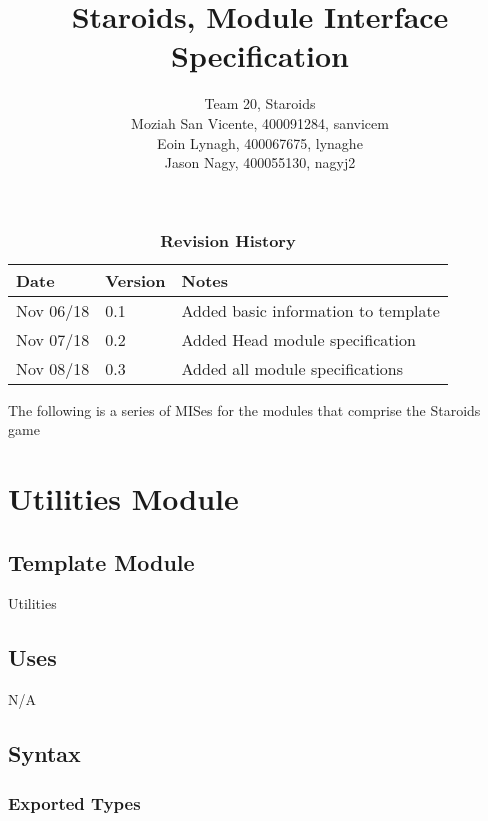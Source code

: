\documentclass[12pt]{article}
\title{Staroids, Module Interface Specification}
\author{Team 20, Staroids
  \\ Moziah San Vicente, 400091284, sanvicem
  \\ Eoin Lynagh, 400067675, lynaghe
  \\ Jason Nagy, 400055130, nagyj2
}
\begin{document}
\maketitle

\begin{table}[bp]
\caption{\bf Revision History}
\begin{tabularx}{\textwidth}{p{3cm}p{2cm}X}
\toprule {\bf Date} & {\bf Version} & {\bf Notes}\\
\midrule
Nov 06/18 & 0.1 & Added basic information to template\\
Nov 07/18 & 0.2 & Added Head module specification\\
Nov 08/18 & 0.3 & Added all module specifications\\
\bottomrule
\end{tabularx}
\end{table}

The following is a series of MISes for the modules that comprise the Staroids game

\newpage

\section*{Utilities Module}

\subsection*{Template Module}

Utilities

\subsection*{Uses}

N/A

\subsection*{Syntax}

\subsubsection*{Exported Types}
\end{document}
